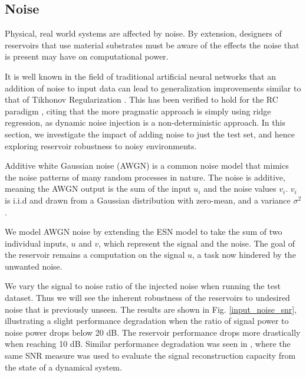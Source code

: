 
\subsection{Noise}



Physical, real world systems are affected by noise. By extension, designers of
reservoirs that use material substrates must be aware of the effects the noise
that is present may have on computational power.

It is well known in the field of traditional artificial neural networks that an
addition of noise to input data can lead to generalization improvements similar
to that of Tikhonov Regularization \cite{bishop_training_1995}. This has been
verified to hold for the RC paradigm \cite{kurkova_stable_2008}, citing that the
more pragmatic approach is simply using ridge regression, as dynamic noise
injection is a non-deterministic approach. In this section, we investigate the
impact of adding noise to just the test set, and hence exploring reservoir
robustness to noisy environments.

Additive white Gaussian noise (AWGN) is a common noise model that mimics the
noise patterns of many random processes in nature. The noise is additive,
meaning the AWGN output is the sum of the input $u_{i}$ and the noise values
$v_{i}$. $v_{i}$ is i.i.d and drawn from a Gaussian distribution with zero-mean,
and a variance $\sigma^{2}$.

We model AWGN noise by extending the ESN model to take the sum of two individual
inputs, $u$ and $v$, which represent the signal and the noise. The goal of the
reservoir remains a computation on the signal $u$, a task now hindered by the
unwanted noise.

We vary the signal to noise ratio of the injected noise when running the test
dataset. Thus we will see the inherent robustness of the reservoirs to undesired
noise that is previously unseen. The results are shown in
Fig. \ref{input_noise_snr}, illustrating a slight performance degradation when
the ratio of signal power to noise power drops below 20 dB. The reservoir
performance drops more drastically when reaching 10 dB. Similar performance
degradation was seen in \cite{dambre_information_2012}, where the same SNR
measure was used to evaluate the signal reconstruction capacity from the state
of a dynamical system.

